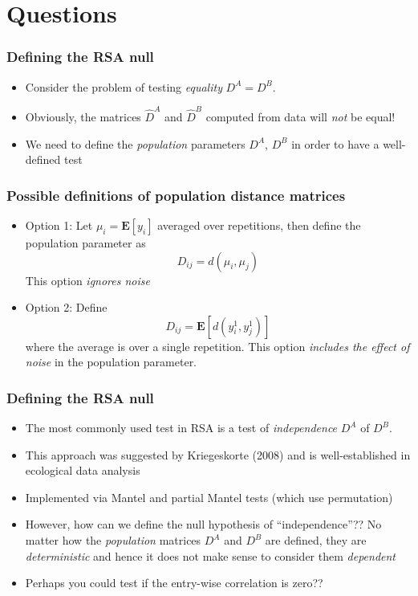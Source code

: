 \documentclass{beamer}
\newcommand{\E}{\textbf{E}}
\begin{document}
\section{Questions}

\begin{frame}
\frametitle{Defining the RSA null}
\begin{itemize}
\item Consider the problem of testing \emph{equality} $D^A = D^B$.
\item Obviously, the matrices $\hat{D}^A$ and $\hat{D}^B$ computed from data will \emph{not} be equal!
\item We need to define the \emph{population} parameters $D^A$, $D^B$ in order to have a well-defined test
\end{itemize}
\end{frame}

\begin{frame}
\frametitle{Possible definitions of population distance matrices}
\begin{itemize}
\item Option 1: Let $\mu_i = \E[y_i]$ averaged over repetitions, then define the population parameter as
\[
D_{ij} = d(\mu_i, \mu_j)
\]
This option \emph{ignores noise}
\item Option 2: Define
\[
D_{ij} = \E[d(y_i^1, y_j^1)]
\]
where the average is over a single repetition.  This option \emph{includes the effect of noise} in the population parameter.
\end{itemize}
\end{frame}

\begin{frame}
\frametitle{Defining the RSA null}
\begin{itemize}
\item The most commonly used test in RSA is a test of \emph{independence} $D^A$ of $D^B$.
\item This approach was suggested by Kriegeskorte (2008) and is well-established in ecological data analysis
\item Implemented via Mantel and partial Mantel tests (which use permutation)
\item However, how can we define the null hypothesis of
  ``independence''??  No matter how the \emph{population} matrices
  $D^A$ and $D^B$ are defined, they are \emph{deterministic} and hence
  it does not make sense to consider them \emph{dependent}
\item Perhaps you could test if the entry-wise correlation is zero??
\end{itemize}
\end{frame}
\end{document}
